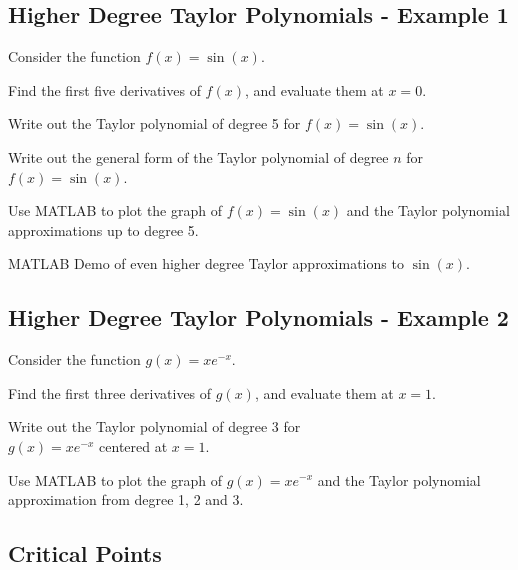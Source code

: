 \newpage
\subsection*{Higher Degree Taylor Polynomials - Example 1}

Consider the function $f(x) = \sin(x)$.

\problem Find the first five derivatives of $f(x)$, and evaluate them at $x=0$.


\newpage

\problem Write out the Taylor polynomial of degree 5 for
$f(x) = \sin(x)$.

\vfill

\problem Write out the general form of the Taylor polynomial of degree
$n$ for $f(x) = \sin(x)$.

\vfill

\newpage

\problem Use MATLAB to plot the graph of $f(x) = \sin(x)$ and the
Taylor polynomial approximations up to degree 5.

\newpage

MATLAB Demo of even higher degree Taylor approximations to $\sin(x)$.

\newpage


\subsection*{Higher Degree Taylor Polynomials - Example 2}

Consider the function $g(x) = x e^{-x}$.

\problem Find the first three derivatives of $g(x)$, and evaluate them
at $x=1$.


\newpage

\problem Write out the Taylor polynomial of degree 3 for \\
$g(x) = x e^{-x}$ centered at $x=1$.

\vfill

\newpage

\problem Use MATLAB to plot the graph of $g(x) = x e^{-x}$ and the
Taylor polynomial approximation from degree 1, 2 and 3.

\newpage
{}

\subsection*{Critical Points} 

